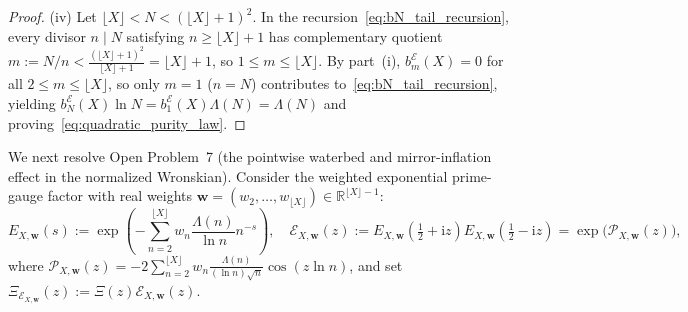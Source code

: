 \documentclass[11pt,reqno]{amsart}
\theoremstyle{definition}
\theoremstyle{remark}
\numberwithin{equation}{section}
\newcommand{\R}{\mathbb{R}}
\newcommand{\ii}{\mathrm{i}}
\begin{document}
\begin{proof}
(iv) Let $\lfloor X\rfloor < N < (\lfloor X\rfloor + 1)^2$. In the recursion~\eqref{eq:bN_tail_recursion}, every divisor $n \mid N$ satisfying $n \ge \lfloor X\rfloor + 1$ has complementary quotient $m := N/n < \frac{(\lfloor X\rfloor + 1)^2}{\lfloor X\rfloor + 1} = \lfloor X\rfloor + 1$, so $1 \le m \le \lfloor X\rfloor$. By part~(i), $b_m^{\mathcal{E}}(X) = 0$ for all $2 \le m \le \lfloor X\rfloor$, so only $m = 1$ ($n = N$) contributes to~\eqref{eq:bN_tail_recursion}, yielding $b_N^{\mathcal{E}}(X)\ln N = b_1^{\mathcal{E}}(X)\Lambda(N) = \Lambda(N)$ and proving~\eqref{eq:quadratic_purity_law}.
\end{proof}

We next resolve Open Problem~7 (the pointwise waterbed and mirror-inflation effect in the normalized Wronskian). Consider the weighted exponential prime-gauge factor with real weights $\mathbf{w} = (w_2, \dots, w_{\lfloor X\rfloor}) \in \R^{\lfloor X\rfloor - 1}$:
\begin{equation}\label{eq:EX_weighted_def}
E_{X,\mathbf{w}}(s) := \exp\!\left(-\sum_{n=2}^{\lfloor X\rfloor} w_n\frac{\Lambda(n)}{\ln n}n^{-s}\right), \quad \mathcal{E}_{X,\mathbf{w}}(z) := E_{X,\mathbf{w}}\!\left(\tfrac{1}{2}+\ii z\right)E_{X,\mathbf{w}}\!\left(\tfrac{1}{2}-\ii z\right) = \exp\!\bigl(\mathcal{P}_{X,\mathbf{w}}(z)\bigr),
\end{equation}
where $\mathcal{P}_{X,\mathbf{w}}(z) = -2\sum_{n=2}^{\lfloor X\rfloor} w_n\frac{\Lambda(n)}{(\ln n)\sqrt{n}}\cos(z\ln n)$, and set $\Xi_{\mathcal{E}_{X,\mathbf{w}}}(z) := \Xi(z)\mathcal{E}_{X,\mathbf{w}}(z)$.
\end{document}
